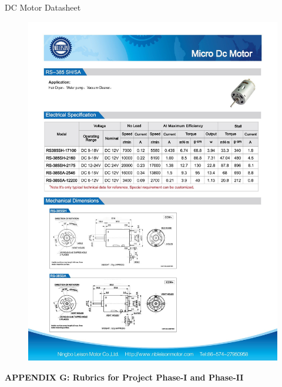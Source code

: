 \documentclass[a4paper,12pt]{article}
\begin{document}
\newpage
DC Motor Datasheet
\begin{figure}[!h]
\centering
\includegraphics[scale=0.28]{dcm.jpg}\\
\end{figure}


\newpage
\thispagestyle{empty}
\vspace*{0.25\textheight}
\begin{center}
\LARGE\textbf{APPENDIX G:  Rubrics for Project Phase-I and Phase-II}
\end{center}

\newpage



\enddocument
\end{document}
